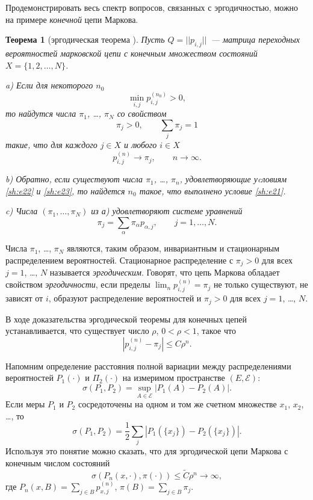\documentclass[14pt]{extarticle}
\newtheorem{theorem}{Теорема}
\begin{document}
Продемонстрировать весь спектр вопросов, связанных с эргодичностью, можно на
примере \emph{конечной} цепи Маркова.

\begin{theorem}[эргодическая теорема \cite{Shyr}]
Пусть $Q=||p_{i,j}||$~--- матрица переходных вероятностей марковской цепи с
конечным множеством состояний $X=\{1, 2, \ldots, N\}$.\par
a) Если для некоторого $n_0$
\begin{equation}\label{sh:e21}
\min_{i,j} p^{(n_0)}_{i,j}>0,
\end{equation}
то найдутся числа $\pi_1$, \ldots, $\pi_N$ со свойством
\begin{equation}\label{sh:e22}
\pi_j>0, \qquad \sum_{j} \pi_j=1
\end{equation}
такие, что для каждого $j\in X$ и любого $i\in X$
\begin{equation}\label{sh:e23}
p^{(n)}_{i,j}\to \pi_j, \qquad n\to\infty.
\end{equation}

b) Обратно, если существуют числа $\pi_1$, \ldots, $\pi_n$, удовлетворяющие
уcловиям \eqref{sh:e22} и \eqref{sh:e23}, то найдется $n_0$ такое, что выполнено
условие  \eqref{sh:e21}.\par

c) Числа $(\pi_1, \ldots, \pi_N)$ из а) удовлетворяют системе уравнений
\[
\pi_j = \sum_{\alpha} \pi_\alpha p_{\alpha, j}, \qquad j=1, \ldots, N.
\]
\end{theorem}

Числа $\pi_1$, \ldots, $\pi_N$ являются, таким образом, инвариантным и
стационарным распределением вероятностей. Стационарное распределение с $\pi_j>0$
для всех $j=1$, \ldots, $N$ называется \emph{эргодическим}. Говорят, что цепь
Маркова обладает свойством \emph{эргодичности}, если пределы $\lim_{n}
p^{(n)}_{i,j}=\pi_j$ не только существуют, не зависят от $i$, образуют
распределение вероятностей и $\pi_j>0$ для всех $j=1$, \ldots, $N$.

В ходе доказательства эргодической теоремы для конечных цепей устанавливается,
что существует число $\rho$, $0<\rho<1$, такое что
\[
\left| p^{(n)}_{i,j}-\pi_j\right| \leq C \rho^n.
\]

Напомним определение расстояния полной вариации между распределениями
вероятностей $P_1(\cdot)$ и $\Pi_2(\cdot)$ на измеримом пространстве $(E,
\mathcal E)$:
\[
\sigma(P_1, P_2) = \sup_{A\in \mathcal E} |P_1(A)- P_2(A)|.
\]
Если меры $P_1$ и $P_2$ сосредоточены на одном и том же счетном множестве $x_1$,
$x_2$, \ldots{}, то 
\[
\sigma(P_1, P_2) = \frac{1}{2} \sum_{j} |P_1(\{ x_j\}) - P_2(\{x_j\})|.
\]
Используя это понятие можно сказать, что для эргодической цепи Маркова с
конечным числом состояний
\[
\sigma( P_n(x, \cdot), \pi(\cdot))\leqslant \tilde{C}\rho^n\to\infty,
\]
где $P_n(x,B)=\sum_{j\in B} p^{(n)}_{x,j}$, $\pi(B)=\sum_{j\in B} \pi_j$. 
\end{document}
